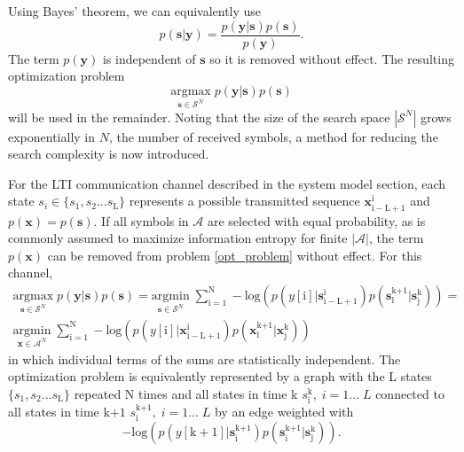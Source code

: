 \documentclass[12pt,a4paper]{report}
\begin{document}
Using Bayes' theorem, we can equivalently use 
\begin{equation*}
p(\mathbf{s}|\mathbf{y}) = 
\frac
{p(\mathbf{y}|\mathbf{s})p(\mathbf{s})}
{p(\mathbf{y})}.
\end{equation*}
The term $p(\mathbf{y})$ is independent of $\mathbf{s}$ so it is removed without effect. The resulting optimization problem
\begin{equation}\label{opt_problem}
\underset{\mathbf{s}\in\mathcal{S}^N}{\text{argmax}}\; p(\mathbf{y}|\mathbf{s})p(\mathbf{s})
\end{equation}
will be used in the remainder.
Noting that the size of the search space $|\mathcal{S}^N|$ grows exponentially in $N$, the number of received symbols, a method for reducing the search complexity is now introduced. 
\par
For the LTI communication channel described in the system model section, each state $s_i \in \{s_1, s_2... s_{\text{L}}\}$ represents a possible transmitted sequence $\mathbf{x}_{\mathrm{i-L+1}}^{\mathrm{i}}$ and $p(\mathbf{x})=p(\mathbf{s})$. If all symbols in $\mathcal{A}$ are selected with equal probability, as is commonly assumed to maximize information entropy for finite $|\mathcal{A}|$, the term $p(\mathbf{x})$ can be removed from problem \ref{opt_problem} without effect. 
For this channel,
\begin{gather*}
\underset{\mathbf{s}\in\mathcal{S}^N}{\text{argmax}} \; p(\mathbf{y}|\mathbf{s})p(\mathbf{s})=
\underset{\mathbf{s}\in\mathcal{S}^N}{\text{argmin}} \; \sum_{\mathrm{i=1}}^{\mathrm{N}} -\text{log}(p(y[\mathrm{i}]|\mathbf{s}_{\mathrm{i-L+1}}^{\mathrm{i}}) p(\mathbf{s}_{\text{l}}^{\text{k+1}}|\mathbf{s}_{\text{j}}^{\text{k}}))=\\
\underset{\mathbf{x}\in\mathcal{A}^N}{\text{argmin}} \; \sum_{\mathrm{i=1}}^{\mathrm{N}} -\text{log}(p(y[\mathrm{i}]|\mathbf{x}_{\mathrm{i-L+1}}^{\mathrm{i}}) p(\mathbf{x}_{\text{l}}^{\text{k+1}}|\mathbf{x}_{\text{j}}^{\text{k}}))
\end{gather*}
in which individual terms of the sums are statistically independent. The optimization problem is equivalently
  represented by a graph with the L states $\{s_1, s_2... s_{\text{L}}\}$ repeated N times and all states in time k $s_{\text{i}}^{\text{k}}, \; i = 1... \;L$ connected to all states in time k$+1$ $s_{\text{i}}^{\text{k+1}}, \; i = 1... \;L$ 
   by an edge weighted with
\begin{equation*}
-\text{log}(p(y[\text{k}+1]|\mathbf{s}_{\text{i}}^{\text{k+1}})p(\mathbf{s}_{\text{i}}^{\text{k+1}}|\mathbf{s}_{\text{j}}^{\text{k}})).
\end{equation*}   
\end{document}
